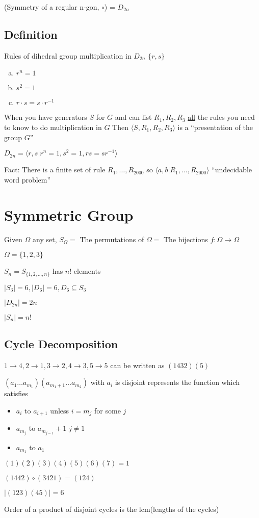 (Symmetry of a regular n-gon, $\circ$) = $D_{2n}$

\subsection{Definition}

Rules of dihedral group multiplication in $D_{2n}$
$\{r, s\}$

\begin{enumerate}[a)]
  \item $r^n = 1$
  \item $s^2 = 1$
  \item $r \cdot s = s \cdot r^{-1}$
\end{enumerate}

When you have generators $S$ for $G$ and can list $R_1, R_2, R_3$ 
\underline{all} the rules you need to know to do multiplication in $G$
Then $\langle S, R_1, R_2, R_3\rangle$ is a ``presentation of the group $G$''

$D_{2n} = \langle r, s | r^n = 1, s^2 = 1, rs = sr^{-1}\rangle$

Fact: There is a finite set of rule $R_1, \dotsc, R_{2000}$
so $\langle a, b|R_1, \dotsc, R_{2000}\rangle$ ``undecidable word problem''

\section{Symmetric Group}

Given $\Omega$ any set, $S_\Omega = $ The permutations of $\Omega =$ The bijections $f: \Omega \to \Omega$

\begin{example}
  $\Omega = \{1, 2, 3\}$ 

  $S_n = S_{\{1, 2, \dotsc, n\}}$ has $n!$ elements

  $|S_3| = 6, |D_6| = 6, D_6 \subseteq S_3$

  $|D_{2n}| = 2n$

  $|S_n| = n!$
\end{example}

\subsection{Cycle Decomposition}

$1 \to 4, 2 \to 1, 3 \to 2, 4 \to 3, 5 \to 5$ can be written as
$(1432)(5)$

$(a_1 \dotsc a_{m_1})(a_{m_1+1} \dotsc a_{m_2})$ with $a_i$ is disjoint
represents the function which satisfies

\begin{itemize}
  \item $a_i$ to $a_{i+1}$ unless $i = m_j$ for some $j$
  \item $a_{m_j}$ to $a_{m_{j-1}}+1$ $j \neq 1$
  \item $a_{m_1}$ to $a_1$
\end{itemize}

$(1)(2)(3)(4)(5)(6)(7) = 1$

$(1442)\circ(3421)=(124)$

$|(123)(45)|=6$

Order of a product of disjoint cycles is the lcm(lengths of the cycles)